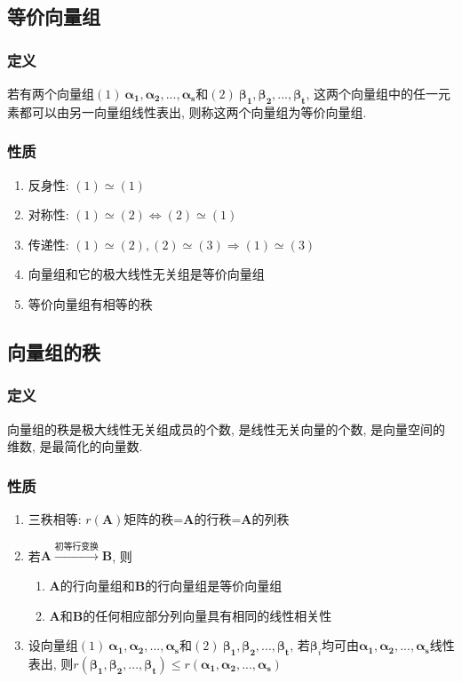 \subsection{等价向量组}
\subsubsection{定义}
若有两个向量组$ (1)\ \bm{\alpha_{1}},\bm{\alpha_{2}},...,\bm{\alpha_{s}} $和$ (2)\ \bm{\beta_{1}},\bm{\beta_{2}},...,\bm{\beta_{t}} $, 这两个向量组中的任一元素都可以由另一向量组线性表出, 则称这两个向量组为等价向量组.
\subsubsection{性质}
\begin{enumerate}
\item 反身性: $ (1)\simeq (1) $
\item 对称性: $ (1)\simeq (2) \Leftrightarrow (2)\simeq (1) $
\item 传递性: $ (1)\simeq (2), (2)\simeq (3) \Rightarrow (1)\simeq (3) $
\item 向量组和它的极大线性无关组是等价向量组
\item 等价向量组有相等的秩
\end{enumerate}
\subsection{向量组的秩}
\subsubsection{定义}
向量组的秩是极大线性无关组成员的个数, 是线性无关向量的个数, 是向量空间的维数, 是最简化的向量数.
\subsubsection{性质}
\begin{enumerate}
\item 三秩相等: $ r(\bm{A}) $矩阵的秩=$ \bm{A} $的行秩=$ \bm{A} $的列秩
\item 若$ \bm{A}\xrightarrow{\text{初等行变换}}\bm{B}$, 则
\begin{enumerate}
\item $ \bm{A} $的行向量组和$ \bm{B} $的行向量组是等价向量组
\item $ \bm{A} $和$ \bm{B} $的任何相应部分列向量具有相同的线性相关性
\end{enumerate}
\item 设向量组$ (1)\ \bm{\alpha_{1}},\bm{\alpha_{2}},...,\bm{\alpha_{s}} $和$ (2)\ \bm{\beta_{1}},\bm{\beta_{2}},...,\bm{\beta_{t}} $, 若$ \bm{\beta}_{i} $均可由$ \bm{\alpha_{1}},\bm{\alpha_{2}},...,\bm{\alpha_{s}} $线性表出, 则$ r(\bm{\beta_{1}},\bm{\beta_{2}},...,\bm{\beta_{t}})\le r(\bm{\alpha_{1}},\bm{\alpha_{2}},...,\bm{\alpha_{s}}) $
\end{enumerate}
